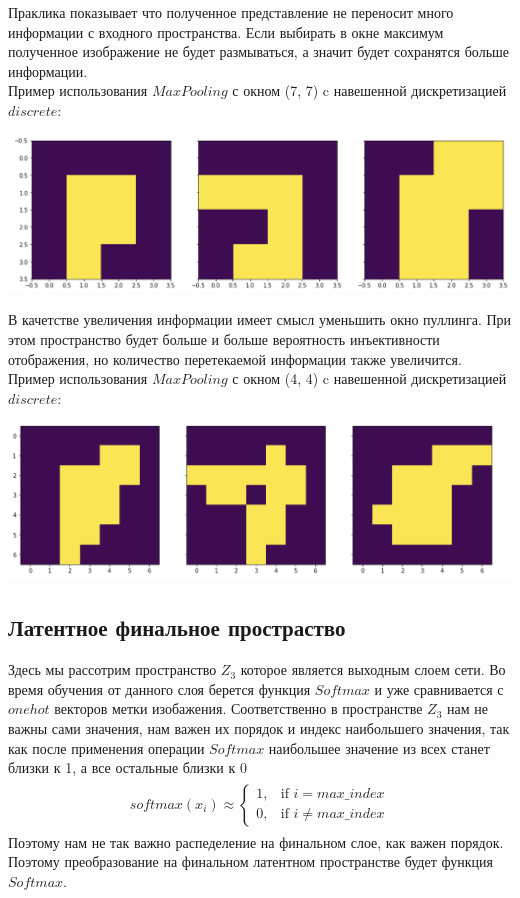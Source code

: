 Праклика показывает что полученное представление не переносит много информации с входного пространства. Если выбирать в окне максимум полученное изображение не будет размываться, а значит будет сохранятся больше информации. \\
Пример использования $Max Pooling$ с окном (7, 7) c навешенной дискретизацией  $discrete$:
\begin{center}
    \includegraphics[scale=0.5]{images/plt_max_7.png}
\end{center}
В качетстве увеличения информации имеет смысл уменьшить окно пуллинга. При этом пространство будет больше и больше вероятность инъективности отображения, но количество перетекаемой информации также увеличится. \\
Пример использования $Max Pooling$ с окном (4, 4) c навешенной дискретизацией  $discrete$:
\begin{center}
    \includegraphics[scale=0.5]{images/plt_max_4.png}
\end{center}

\subsection{Латентное финальное простраство}
Здесь мы рассотрим пространство $Z_3$ которое является выходным слоем сети. Во время обучения от данного слоя берется функция $Softmax$ и уже сравнивается с $one hot$ векторов метки изобажения. Соответственно в пространстве $Z_3$ нам не важны сами значения, нам важен их порядок и индекс наибольшего значения, так как после применения операции $Softmax$ наибольшее значение из всех станет близки к 1, а все остальные близки к 0
\begin{gather}
\begin{aligned}  
softmax(x_i) \approx 
\begin{cases}
    1, & \text{if } i = max\_index\\
    0, & \text{if } i \neq max\_index
\end{cases}
\end{aligned}
\end{gather}
Поэтому нам не так важно распеделение на финальном слое, как важен порядок. Поэтому преобразование на финальном латентном пространстве будет функция $Softmax$.
